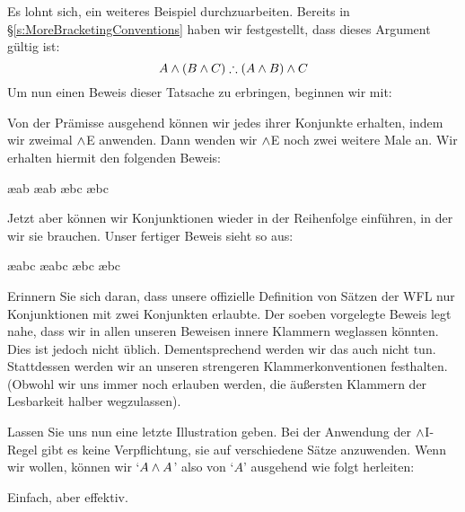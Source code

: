 Es lohnt sich, ein weiteres Beispiel durchzuarbeiten. Bereits in \S\ref{s:MoreBracketingConventions} haben wir festgestellt, dass dieses Argument gültig ist:
	$$A \eand (B \eand C) \therefore (A \eand B) \eand C$$
Um nun einen Beweis dieser Tatsache zu erbringen, beginnen wir mit:
\begin{fitchproof}
\end{fitchproof}
Von der Prämisse ausgehend können wir jedes ihrer Konjunkte erhalten, indem wir zweimal $\wedge $E anwenden. Dann wenden wir $\wedge $E noch zwei weitere Male an. Wir erhalten hiermit den folgenden Beweis:
\begin{fitchproof}
	 \ae{ab}
	 \ae{ab}
	 \ae{bc}
	 \ae{bc}
\end{fitchproof}
Jetzt aber können wir Konjunktionen wieder in der Reihenfolge einführen, in der wir sie brauchen. Unser fertiger Beweis sieht so aus:
\begin{fitchproof}
	 \ae{abc}
	 \ae{abc}
	 \ae{bc}
	 \ae{bc}
\end{fitchproof}
Erinnern Sie sich daran, dass unsere offizielle Definition von Sätzen der WFL nur Konjunktionen mit zwei Konjunkten erlaubte. Der soeben vorgelegte Beweis legt nahe, dass wir in allen unseren Beweisen innere Klammern weglassen könnten. Dies ist jedoch nicht üblich. Dementsprechend werden wir das auch nicht tun. Stattdessen werden wir an unseren strengeren Klammerkonventionen festhalten. (Obwohl wir uns immer noch erlauben werden, die äu{\ss}ersten Klammern der Lesbarkeit halber wegzulassen).

Lassen Sie uns nun eine letzte Illustration geben. Bei der Anwendung der $\wedge$I-Regel gibt es keine Verpflichtung, sie auf verschiedene Sätze anzuwenden. Wenn wir wollen, können wir `$A \wedge A$' also von `$A$' ausgehend wie folgt herleiten:
\begin{fitchproof}
\end{fitchproof}
Einfach, aber effektiv.

